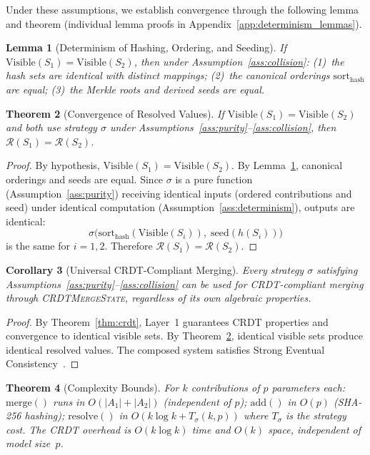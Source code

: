 \documentclass[10pt,letterpaper]{article}
\newcommand{\CMS}{\texorpdfstring{{\mdseries\upshape\textsc{CRDTMergeState}}}{CRDTMergeState}}
\newtheorem{theorem}{Theorem}
\newtheorem{lemma}[theorem]{Lemma}
\newtheorem{corollary}[theorem]{Corollary}
\begin{document}
Under these assumptions, we establish convergence through the following lemma and theorem (individual lemma proofs in Appendix~\ref{app:determinism_lemmas}).

\begin{lemma}[Determinism of Hashing, Ordering, and Seeding]\label{lem:determinism}
If $\mathrm{Visible}(S_1) = \mathrm{Visible}(S_2)$, then under Assumption~\ref{ass:collision}: (1)~the hash sets are identical with distinct mappings; (2)~the canonical orderings $\mathrm{sort}_{\mathrm{hash}}$ are equal; (3)~the Merkle roots and derived seeds are equal.
\end{lemma}

\begin{theorem}[Convergence of Resolved Values]\label{thm:convergence}
If $\mathrm{Visible}(S_1) = \mathrm{Visible}(S_2)$ and both use strategy $\sigma$ under Assumptions~\ref{ass:purity}--\ref{ass:collision}, then $\mathcal{R}(S_1) = \mathcal{R}(S_2)$.
\end{theorem}

\begin{proof}
By hypothesis, $\mathrm{Visible}(S_1) = \mathrm{Visible}(S_2)$.
By Lemma~\ref{lem:determinism}, canonical orderings and seeds are equal.
Since $\sigma$ is a pure function (Assumption~\ref{ass:purity}) receiving identical inputs (ordered contributions and seed) under identical computation (Assumption~\ref{ass:determinism}), outputs are identical:
\[
\sigma\!\bigl(\mathrm{sort}_{\mathrm{hash}}(\mathrm{Visible}(S_i)),\; \mathrm{seed}(h(S_i))\bigr)
\]
is the same for $i=1,2$. Therefore $\mathcal{R}(S_1) = \mathcal{R}(S_2)$.
\end{proof}

\begin{corollary}[Universal CRDT-Compliant Merging]\label{cor:universal}
Every strategy $\sigma$ satisfying Assumptions~\ref{ass:purity}--\ref{ass:collision} can be used for CRDT-compliant merging through \CMS{}, regardless of its own algebraic properties.
\end{corollary}

\begin{proof}
By Theorem~\ref{thm:crdt}, Layer~1 guarantees CRDT properties and convergence to identical visible sets.
By Theorem~\ref{thm:convergence}, identical visible sets produce identical resolved values.
The composed system satisfies Strong Eventual Consistency~\cite{shapiro2011conflict}.
\end{proof}

\begin{theorem}[Complexity Bounds]\label{thm:complexity}
For $k$ contributions of $p$ parameters each:
$\mathrm{merge}()$ runs in $O(|A_1|+|A_2|)$ (independent of $p$);
$\mathrm{add}()$ in $O(p)$ (SHA-256 hashing);
$\mathrm{resolve}()$ in $O(k\log k + T_\sigma(k,p))$ where $T_\sigma$ is the strategy cost.
The CRDT overhead is $O(k\log k)$ time and $O(k)$ space, independent of model size~$p$.
\end{theorem}
\end{document}
